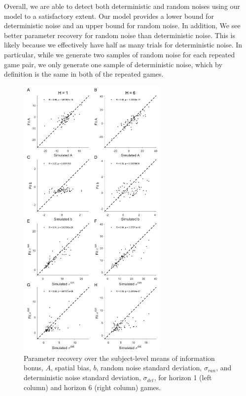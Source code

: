 \documentclass[12pt]{article}
\begin{document}
	Overall, we are able to detect both deterministic and random noises using our model to a satisfactory extent. Our model provides a lower bound for deterministic noise and an upper bound for random noise. In addition, We see better parameter recovery for random noise than deterministic noise. This is likely because we effectively have half as many trials for deterministic noise. In particular, while we generate two samples of random noise for each repeated game pair, we only generate one sample of deterministic noise, which by definition is the same in both of the repeated games. 
	
	\begin{figure}[hp]
		\begin{center}
			\includegraphics[width=0.65\textwidth]{figures/RDBayes_parameterrecovery_subject_examplesession.jpg}
			\caption{Parameter recovery over the subject-level means of information bonus, $A$, spatial bias, $b$, random noise standard deviation, $\sigma_{ran}$, and deterministic noise standard deviation, $\sigma_{det}$, for horizon 1 (left column) and horizon 6 (right column) games.}
			\label{fig:paramrecover_session}
		\end{center}
	\end{figure} 
\end{document}
